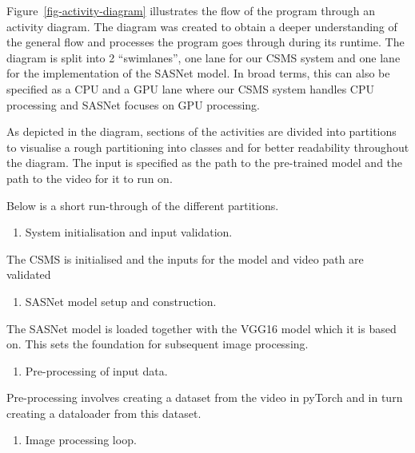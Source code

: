 \documentclass[
]{article}
\providecommand{\tightlist}{%
  \setlength{\itemsep}{0pt}\setlength{\parskip}{0pt}}\usepackage{longtable,booktabs,array}
\begin{document}
Figure~\ref{fig-activity-diagram} illustrates the flow of the program
through an activity diagram. The diagram was created to obtain a deeper
understanding of the general flow and processes the program goes through
during its runtime. The diagram is split into 2 ``swimlanes'', one lane
for our CSMS system and one lane for the implementation of the SASNet
model. In broad terms, this can also be specified as a CPU and a GPU
lane where our CSMS system handles CPU processing and SASNet focuses on
GPU processing.

As depicted in the diagram, sections of the activities are divided into
partitions to visualise a rough partitioning into classes and for better
readability throughout the diagram. The input is specified as the path
to the pre-trained model and the path to the video for it to run on.

Below is a short run-through of the different partitions.

\begin{enumerate}
\def\labelenumi{\arabic{enumi}.}
\tightlist
\item
  System initialisation and input validation.
\end{enumerate}

The CSMS is initialised and the inputs for the model and video path are
validated

\begin{enumerate}
\def\labelenumi{\arabic{enumi}.}
\setcounter{enumi}{1}
\tightlist
\item
  SASNet model setup and construction.
\end{enumerate}

The SASNet model is loaded together with the VGG16 model which it is
based on. This sets the foundation for subsequent image processing.

\begin{enumerate}
\def\labelenumi{\arabic{enumi}.}
\setcounter{enumi}{2}
\tightlist
\item
  Pre-processing of input data.
\end{enumerate}

Pre-processing involves creating a dataset from the video in pyTorch and
in turn creating a dataloader from this dataset.

\begin{enumerate}
\def\labelenumi{\arabic{enumi}.}
\setcounter{enumi}{3}
\tightlist
\item
  Image processing loop.
\end{enumerate}
\end{document}
